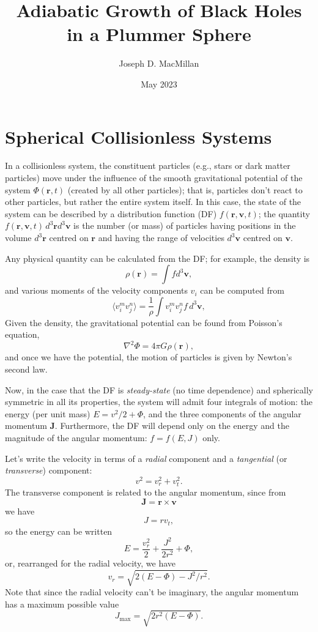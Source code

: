 \documentclass[10pt]{article}
\title{Adiabatic Growth of Black Holes in a Plummer Sphere}
\author{Joseph D. MacMillan}
\date{May 2023}
\begin{document}
\maketitle

\section{Spherical Collisionless Systems}

In a collisionless system, the constituent particles (e.g., stars or dark matter particles) move under the influence of the smooth gravitational potential of the system $\Phi(\textbf{r}, t)$ (created by all other particles); that is, particles don't react to other particles, but rather the entire system itself.  In this case, the state of the system can be described by a distribution function (DF) $f(\textbf{r}, \textbf{v}, t)$; the quantity $f(\textbf{r}, \textbf{v}, t)\, d^3\textbf{r} d^3 \textbf{v}$ is the number (or mass) of particles having positions in the volume $d^3\textbf{r}$ centred on $\textbf{r}$ and having the range of velocities $d^3 \textbf{v}$ centred on $\textbf{v}$.

Any physical quantity can be calculated from the DF; for example, the density is
\[
\rho(\textbf{r}) = \int f d^3\textbf{v},
\]
and various moments of the velocity components $v_i$ can be computed from
\[
\langle v_i^m v_j^n \rangle = \frac{1}{\rho} \int v_i^m v_j^n f \, d^3\textbf{v},
\]
Given the density, the gravitational potential can be found from Poisson's equation,
\[
\nabla^2 \Phi = 4\pi G \rho(\textbf{r}),
\]
and once we have the potential, the motion of particles is given by Newton's second law.

Now, in the case that the DF is \emph{steady-state} (no time dependence) and spherically symmetric in all its properties, the system will admit four integrals of motion:  the energy (per unit mass) $E = v^2 /2 + \Phi$, and the three components of the angular momentum $\textbf{J}$.  Furthermore, the DF will depend only on the energy and the magnitude of the angular momentum:  $f = f(E, J)$ only.  

Let's write the velocity in terms of a \emph{radial} component and a \emph{tangential} (or \emph{transverse}) component: 
\[
v^2 = v_r^2 + v_t^2.
\]
The transverse component is related to the angular momentum, since from
\[
\textbf{J} = \textbf{r} \times \textbf{v}
\]
we have
\begin{equation}
J = rv_t,
\end{equation}
so the energy can be written 
\[
E = \frac{v_r^2}{2} + \frac{J^2}{2r^2} + \Phi,
\]
or, rearranged for the radial velocity, we have
\begin{equation}
v_r = \sqrt{2 (E - \Phi) - J^2/r^2}.
\end{equation}
Note that since the radial velocity can't be imaginary, the angular momentum has a maximum possible value 
\begin{equation}
J_\text{max} = \sqrt{2r^2 (E - \Phi)}.
\end{equation}
\end{document}
